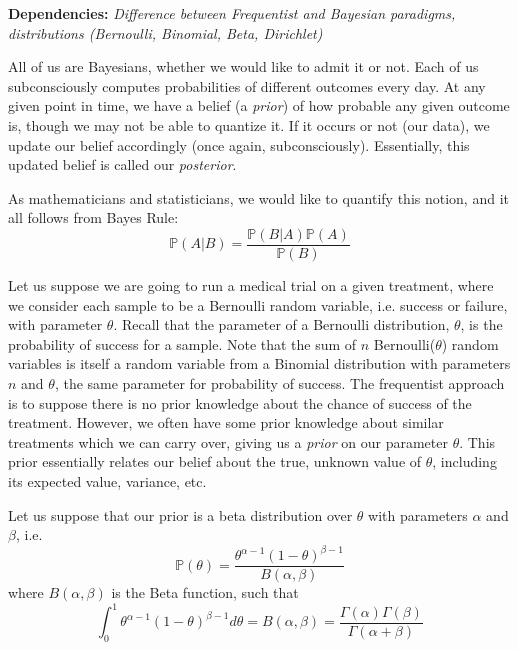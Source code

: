 
\textbf{Dependencies:} \emph{Difference between Frequentist and Bayesian paradigms, distributions (Bernoulli, Binomial, Beta, Dirichlet)}

All of us are Bayesians, whether we would like to admit it or not. Each of us subconsciously computes probabilities of different outcomes every day. At any given point in time, we have a belief (a \emph{prior}) of how probable any given outcome is, though we may not be able to quantize it. If it occurs or not (our data), we update our belief accordingly (once again, subconsciously). Essentially, this updated belief is called our \emph{posterior}.

As mathematicians and statisticians, we would like to quantify this notion, and it all follows from Bayes Rule:
\begin{equation*}
\mathbb{P}(A | B) = \frac{\mathbb{P}(B | A)\mathbb{P}(A)}{\mathbb{P}(B)}
\end{equation*}

Let us suppose we are going to run a medical trial on a given treatment, where we consider each sample to be a Bernoulli random variable, i.e. success or failure, with parameter $\theta$. Recall that the parameter of a Bernoulli distribution, $\theta$, is the probability of success for a sample.  Note that the sum of $n$ Bernoulli($\theta$) random variables is itself a random variable from a Binomial distribution with parameters $n$ and $\theta$, the same parameter for probability of success. The frequentist approach is to suppose there is no prior knowledge about the chance of success of the treatment. However, we often have some prior knowledge about similar treatments which we can carry over, giving us a \emph{prior} on our parameter $\theta$. This prior essentially relates our belief about the true, unknown value of $\theta$, including its expected value, variance, etc.

Let us suppose that our prior is a beta distribution over $\theta$ with parameters $\alpha$ and $\beta$, i.e. 
\begin{equation*}
\mathbb{P}(\theta) = \frac{\theta^{\alpha - 1}(1 - \theta)^{\beta - 1}}{B(\alpha,\beta)}
\end{equation*}
where $B(\alpha,\beta)$ is the Beta function, such that 
\begin{equation*}
\int_0^1 \theta^{\alpha - 1}(1 - \theta)^{\beta - 1} d\theta = B(\alpha,\beta) = \frac{\Gamma(\alpha)\Gamma(\beta)}{\Gamma(\alpha +\beta)}
\end{equation*}

